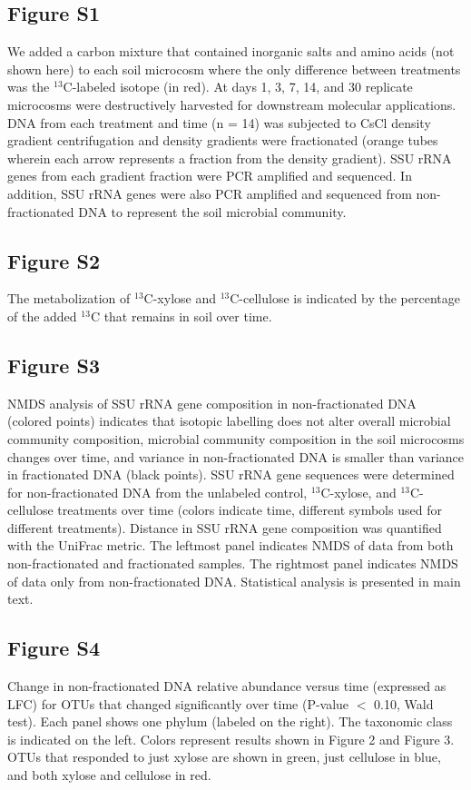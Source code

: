 \subsection{Figure S1}
We added a carbon mixture that contained inorganic
salts and amino acids (not shown here) to each soil microcosm where the
only difference between treatments was the $^{13}$C-labeled isotope (in red). At days
1, 3, 7, 14, and 30 replicate microcosms were destructively harvested for
downstream molecular applications. DNA from each treatment and time (n = 14)
was subjected to CsCl density gradient centrifugation and density gradients
were fractionated (orange tubes wherein each arrow represents a fraction from
the density gradient). SSU rRNA genes from each gradient fraction were PCR
amplified and sequenced. In addition, SSU rRNA genes were also PCR amplified
and sequenced from non-fractionated DNA to represent the soil microbial
community.

\subsection{Figure S2}
The metabolization of $^{13}$C-xylose and $^{13}$C-cellulose is indicated by
the percentage of the added $^{13}$C that remains in soil over time.
\subsection{Figure S3}
NMDS analysis of SSU rRNA gene composition in non-fractionated DNA (colored points) indicates
that isotopic labelling does not alter overall microbial community composition,
microbial community composition in the soil microcosms changes over time, and
variance in non-fractionated DNA is smaller than variance in fractionated DNA (black points).
SSU rRNA gene sequences were determined for non-fractionated DNA from the
unlabeled control, $^{13}$C-xylose, and $^{13}$C-cellulose treatments over time (colors
indicate time, different symbols used for different treatments). Distance in SSU
rRNA gene composition was quantified with the UniFrac metric. The
leftmost panel indicates NMDS of data from both non-fractionated and
fractionated samples. The rightmost panel indicates NMDS of data only from
non-fractionated DNA. Statistical analysis is presented in main text.
\subsection{Figure S4}
Change in non-fractionated DNA relative abundance versus time (expressed
as LFC) for OTUs that changed significantly over time (P-value $<$ 0.10, Wald test).
Each panel shows one phylum (labeled on the right). The taxonomic class is
indicated on the left. Colors represent results shown in Figure 2 and
Figure 3.  OTUs that responded to just xylose are shown in 
green, just cellulose in blue, and both xylose and cellulose in red.  


